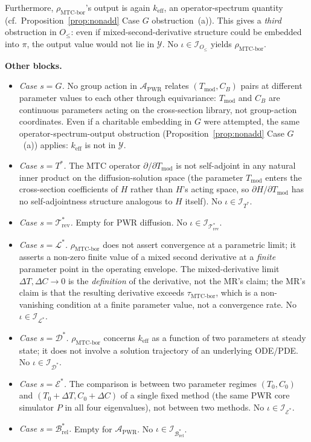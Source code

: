 \documentclass[manuscript]{acmart}
\begin{document}
Furthermore, $\rho_{\mathrm{MTC\text{-}bor}}$'s output is again $k_{\mathrm{eff}}$, an operator-spectrum quantity (cf.\ Proposition~\ref{prop:nonadd} Case $G$ obstruction~(a)). This gives a \emph{third} obstruction in $O_{\le}$: even if mixed-second-derivative structure could be embedded into $\pi$, the output value would not lie in $\mathcal{Y}$. No $\iota \in \mathcal{I}_{O_{\le}}$ yields $\rho_{\mathrm{MTC\text{-}bor}}$.

\textbf{Other blocks.}
\begin{itemize}[leftmargin=*,nosep]
  \item \emph{Case $s = G$.} No group action in $\mathcal{A}_{\mathrm{PWR}}$ relates $(T_{\mathrm{mod}}, C_{B})$ pairs at different parameter values to each other through equivariance: $T_{\mathrm{mod}}$ and $C_{B}$ are continuous parameters acting on the cross-section library, not group-action coordinates. Even if a charitable embedding in $G$ were attempted, the same operator-spectrum-output obstruction (Proposition~\ref{prop:nonadd} Case $G$~(a)) applies: $k_{\mathrm{eff}}$ is not in $\mathcal{Y}$.
  \item \emph{Case $s = T^{*}$.} The MTC operator $\partial/\partial T_{\mathrm{mod}}$ is not self-adjoint in any natural inner product on the diffusion-solution space (the parameter $T_{\mathrm{mod}}$ enters the cross-section coefficients of $H$ rather than $H$'s acting space, so $\partial H/\partial T_{\mathrm{mod}}$ has no self-adjointness structure analogous to $H$ itself). No $\iota \in \mathcal{I}_{T^{*}}$.
  \item \emph{Case $s = \mathcal{T}^{*}_{\mathrm{rev}}$.} Empty for PWR diffusion. No $\iota \in \mathcal{I}_{\mathcal{T}^{*}_{\mathrm{rev}}}$.
  \item \emph{Case $s = \mathcal{L}^{*}$.} $\rho_{\mathrm{MTC\text{-}bor}}$ does not assert convergence at a parametric limit; it asserts a non-zero finite value of a mixed second derivative at a \emph{finite} parameter point in the operating envelope. The mixed-derivative limit $\Delta T, \Delta C \to 0$ is the \emph{definition} of the derivative, not the MR's claim; the MR's claim is that the resulting derivative exceeds $\tau_{\mathrm{MTC\text{-}bor}}$, which is a non-vanishing condition at a finite parameter value, not a convergence rate. No $\iota \in \mathcal{I}_{\mathcal{L}^{*}}$.
  \item \emph{Case $s = \mathcal{D}^{*}$.} $\rho_{\mathrm{MTC\text{-}bor}}$ concerns $k_{\mathrm{eff}}$ as a function of two parameters at steady state; it does not involve a solution trajectory of an underlying ODE/PDE. No $\iota \in \mathcal{I}_{\mathcal{D}^{*}}$.
  \item \emph{Case $s = \mathcal{E}^{*}$.} The comparison is between two parameter regimes $(T_{0}, C_{0})$ and $(T_{0}+\Delta T, C_{0}+\Delta C)$ of a single fixed method (the same PWR core simulator $P$ in all four eigenvalues), not between two methods. No $\iota \in \mathcal{I}_{\mathcal{E}^{*}}$.
  \item \emph{Case $s = \mathcal{B}_{\mathrm{rel}}^{*}$.} Empty for $\mathcal{A}_{\mathrm{PWR}}$. No $\iota \in \mathcal{I}_{\mathcal{B}_{\mathrm{rel}}^{*}}$.
\end{itemize}
\end{document}
